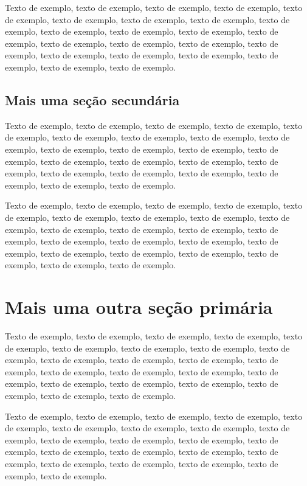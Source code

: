 \documentclass[
	12pt,				%
	oneside,			%
	a4paper,			%
	english,			%
	brazil				%
	]{abntex2ppgsi}
\begin{document}
Texto de exemplo, texto de exemplo, texto de exemplo, texto de exemplo, texto de exemplo, texto de exemplo, texto de exemplo, texto de exemplo, texto de exemplo, texto de exemplo, texto de exemplo, texto de exemplo, texto de exemplo, texto de exemplo, texto de exemplo, texto de exemplo, texto de exemplo, texto de exemplo, texto de exemplo, texto de exemplo, texto de exemplo, texto de exemplo, texto de exemplo.

\section{Mais uma seção secundária}

Texto de exemplo, texto de exemplo, texto de exemplo, texto de exemplo, texto de exemplo, texto de exemplo, texto de exemplo, texto de exemplo, texto de exemplo, texto de exemplo, texto de exemplo, texto de exemplo, texto de exemplo, texto de exemplo, texto de exemplo, texto de exemplo, texto de exemplo, texto de exemplo, texto de exemplo, texto de exemplo, texto de exemplo, texto de exemplo, texto de exemplo.

Texto de exemplo, texto de exemplo, texto de exemplo, texto de exemplo, texto de exemplo, texto de exemplo, texto de exemplo, texto de exemplo, texto de exemplo, texto de exemplo, texto de exemplo, texto de exemplo, texto de exemplo, texto de exemplo, texto de exemplo, texto de exemplo, texto de exemplo, texto de exemplo, texto de exemplo, texto de exemplo, texto de exemplo, texto de exemplo, texto de exemplo.

\chapter{Mais uma outra seção primária}

Texto de exemplo, texto de exemplo, texto de exemplo, texto de exemplo, texto de exemplo, texto de exemplo, texto de exemplo, texto de exemplo, texto de exemplo, texto de exemplo, texto de exemplo, texto de exemplo, texto de exemplo, texto de exemplo, texto de exemplo, texto de exemplo, texto de exemplo, texto de exemplo, texto de exemplo, texto de exemplo, texto de exemplo, texto de exemplo, texto de exemplo.

Texto de exemplo, texto de exemplo, texto de exemplo, texto de exemplo, texto de exemplo, texto de exemplo, texto de exemplo, texto de exemplo, texto de exemplo, texto de exemplo, texto de exemplo, texto de exemplo, texto de exemplo, texto de exemplo, texto de exemplo, texto de exemplo, texto de exemplo, texto de exemplo, texto de exemplo, texto de exemplo, texto de exemplo, texto de exemplo.
\end{document}
